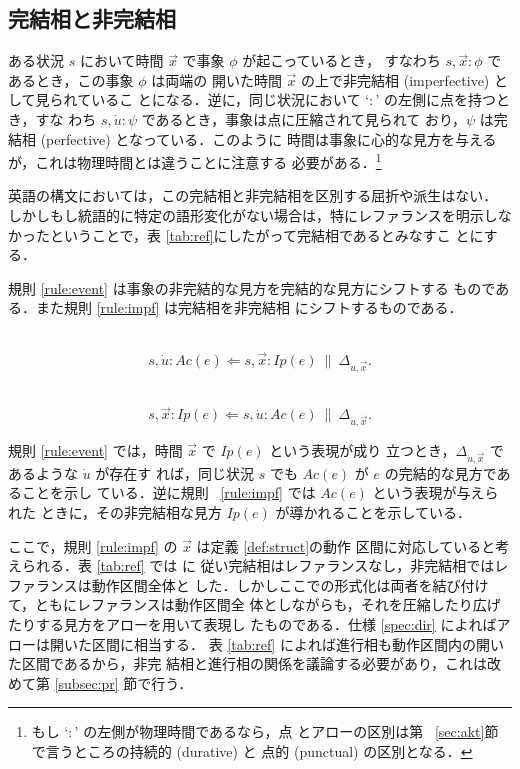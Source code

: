 \subsection{完結相と非完結相}\label{sec:event}
ある状況 $s$ において時間 $\vec x$ で事象 $\phi$ が起こっているとき，
すなわち $s,{\vec x}\colon \phi$ であるとき，この事象 $\phi$ は両端の
開いた時間 $\vec x$ の上で非完結相 (imperfective) として見られているこ
とになる．逆に，同じ状況において `$\colon$' の左側に点を持つとき，すな
わち $s,{\dot u} \colon \psi$ であるとき，事象は点に圧縮されて見られて
おり，$\psi$ は完結相 (perfective) となっている．このように
時間は事象に心的な見方を与えるが，これは物理時間とは違うことに注意する
必要がある．\footnote {もし `$\colon$' の左側が物理時間であるなら，点
とアローの区別は第~  \ref{sec:akt}節で言うところの持続的 (durative) と 
点的 (punctual) の区別となる．}

英語の構文においては，この完結相と非完結相を区別する屈折や派生はない．
しかしもし統語的に特定の語形変化がない場合は，特にレファランスを明示しな
かったということで，表 \ref{tab:ref}にしたがって完結相であるとみなすこ
とにする．

規則 \ref{rule:event} は事象の非完結的な見方を完結的な見方にシフトする
ものである．また規則 \ref{rule:impf} は完結相を非完結相
にシフトするものである．
\begin{my-rule}[完結相] \label{rule:event}~
\[ s,{\dot u} \colon Ac(e) \Leftarrow s,{\vec x}
\colon Ip(e) ~\|~{\Delta}_{{\dot u},{\vec x}}.\] 
\end{my-rule}
\begin{my-rule}[非完結相] \label{rule:impf}~
\[ s,{\vec x} \colon Ip(e) \Leftarrow s,{\dot u}
\colon Ac(e) ~\|~{\Delta}_{{\dot u},{\vec x}}.\] 
\end{my-rule}
規則 \ref{rule:event} では，時間 $\vec x$ で $Ip(e)$ という表現が成り
立つとき，$\Delta_{{\dot u},{\vec x}}$ であるような $\dot u$ が存在す
れば，同じ状況 $s$ でも $Ac(e)$ が $e$ の完結的な見方であることを示し
ている．逆に規則~  \ref{rule:impf} では $Ac(e)$ という表現が与えられた
ときに，その非完結相な見方 $Ip(e)$ が導かれることを示している．

ここで，規則 \ref{rule:impf} の $\vec x$ は定義 \ref{def:struct}の動作
区間に対応していると考えられる．表 \ref{tab:ref} では \cite{Kamp93} に
従い完結相はレファランスなし，非完結相ではレファランスは動作区間全体と
した．しかしここでの形式化は両者を結び付けて，ともにレファランスは動作区間全
体としながらも，それを圧縮したり広げたりする見方をアローを用いて表現し
たものである．仕様 \ref{spec:dir} によればアローは開いた区間に相当する．
表 \ref{tab:ref} によれば進行相も動作区間内の開いた区間であるから，非完
結相と進行相の関係を議論する必要があり，これは改めて第 \ref{subsec:pr}
節で行う．


